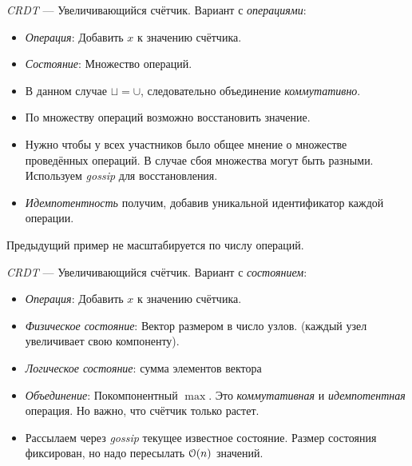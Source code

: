 \begin{example}
    \textit{CRDT} --- Увеличивающийся счётчик.
    Вариант с \textit{операциями}:

    \begin{itemize}
        \item \textit{Операция}: Добавить $x$ к значению счётчика.
        \item \textit{Состояние}: Множество операций.
        \item В данном случае $\sqcup = \cup$, следовательно
            объединение \textit{коммутативно}.
        \item По множеству операций возможно восстановить значение.
        \item Нужно чтобы у всех участников было общее мнение о
            множестве проведённых операций. В случае сбоя множества
            могут быть разными. Используем \textit{gossip} для восстановления.
        \item \textit{Идемпотентность} получим, добавив уникальной
            идентификатор каждой операции.
    \end{itemize}
\end{example}

\begin{remark}
    Предыдущий пример не масштабируется по числу операций.
\end{remark}

\begin{example}
    \textit{CRDT} --- Увеличивающийся счётчик.
    Вариант с \textit{состоянием}:

    \begin{itemize}
        \item \textit{Операция}: Добавить $x$ к значению счётчика.
        \item \textit{Физическое состояние}: Вектор размером в число узлов.
            (каждый узел увеличивает свою компоненту).
        \item \textit{Логическое состояние}: сумма элементов вектора
        \item \textit{Объединение}: Покомпонентный $\max$.
            Это \textit{коммутативная} и \textit{идемпотентная} операция.
            Но важно, что счётчик только растет.
        \item Рассылаем через \textit{gossip} текущее известное состояние.
            Размер состояния фиксирован, но надо пересылать $\mathcal{O}(n)$ значений.
    \end{itemize}
\end{example}

